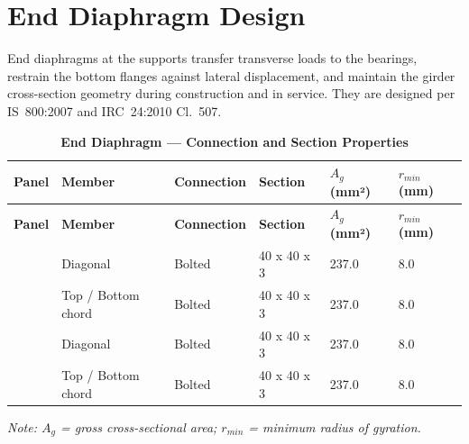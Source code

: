 \documentclass[12pt,a4paper]{report}
\numberwithin{table}{chapter}
\numberwithin{figure}{chapter}
\begin{document}
\section{End Diaphragm Design}
\label{sec:end-diaphragm}

End diaphragms at the supports transfer transverse loads to the bearings, restrain the bottom flanges against lateral displacement, and maintain the girder cross-section geometry during construction and in service. They are designed per IS~800:2007 and IRC~24:2010 Cl.~507.

\vspace{1em}

\vspace{0.4em}
\noindent
\setlength{\tabcolsep}{4pt}
\setlength{\LTleft}{0pt}
\setlength{\LTright}{\fill}

\begin{longtable}{|C{2.0cm}|L{2.0cm}|L{2.2cm}|C{2.5cm}|C{2.0cm}|C{2.0cm}|}
\caption{\textbf{End Diaphragm --- Connection and Section Properties}}
\hline
\textbf{Panel} & \textbf{Member} & \textbf{Connection} & \textbf{Section} & \textbf{$A_g$ (mm²)} & \textbf{$r_{min}$ (mm)} \\[6pt]
\hline
\endfirsthead

\hline
\textbf{Panel} & \textbf{Member} & \textbf{Connection} & \textbf{Section} & \textbf{$A_g$ (mm²)} & \textbf{$r_{min}$ (mm)} \\[6pt]
\hline
\endhead
{} & Diagonal & Bolted & 40 x 40 x 3 & 237.0 & 8.0 \\[6pt]
 & Top / Bottom chord & Bolted & 40 x 40 x 3 & 237.0 & 8.0 \\[6pt]
\hline
{} & Diagonal & Bolted & 40 x 40 x 3 & 237.0 & 8.0 \\[6pt]
 & Top / Bottom chord & Bolted & 40 x 40 x 3 & 237.0 & 8.0 \\[6pt]
\hline
\end{longtable}
\noindent\textit{Note: $A_g$ = gross cross-sectional area; $r_{min}$ = minimum radius of gyration.}
\end{document}
